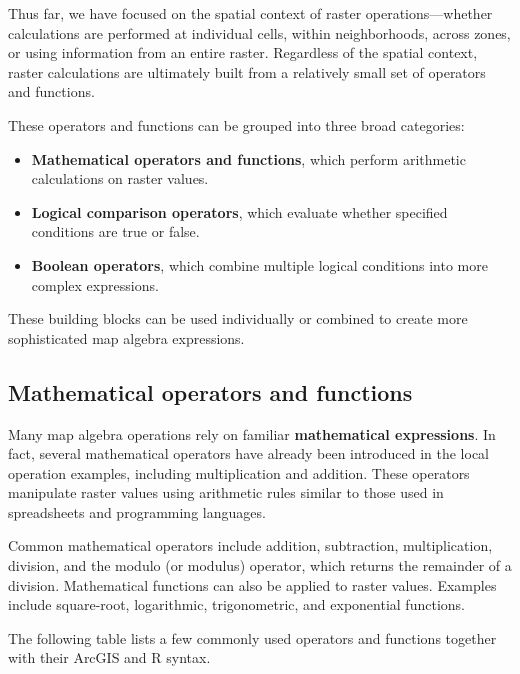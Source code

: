 \documentclass[
  letterpaper,
]{book}
\providecommand{\tightlist}{%
  \setlength{\itemsep}{0pt}\setlength{\parskip}{0pt}}
\begin{document}
Thus far, we have focused on the spatial context of raster
operations---whether calculations are performed at individual cells,
within neighborhoods, across zones, or using information from an entire
raster. Regardless of the spatial context, raster calculations are
ultimately built from a relatively small set of operators and functions.

These operators and functions can be grouped into three broad
categories:

\begin{itemize}
\tightlist
\item
  \textbf{Mathematical operators and functions}, which perform
  arithmetic calculations on raster values.
\item
  \textbf{Logical comparison operators}, which evaluate whether
  specified conditions are true or false.
\item
  \textbf{Boolean operators}, which combine multiple logical conditions
  into more complex expressions.
\end{itemize}

These building blocks can be used individually or combined to create
more sophisticated map algebra expressions.

\subsection{Mathematical operators and
functions}\label{mathematical-operators-and-functions}

Many map algebra operations rely on familiar \textbf{mathematical
expressions}. In fact, several mathematical operators have already been
introduced in the local operation examples, including multiplication and
addition. These operators manipulate raster values using arithmetic
rules similar to those used in spreadsheets and programming languages.

Common mathematical operators include addition, subtraction,
multiplication, division, and the modulo (or modulus) operator, which
returns the remainder of a division. Mathematical functions can also be
applied to raster values. Examples include square-root, logarithmic,
trigonometric, and exponential functions.

The following table lists a few commonly used operators and functions
together with their ArcGIS and R syntax.
\end{document}
